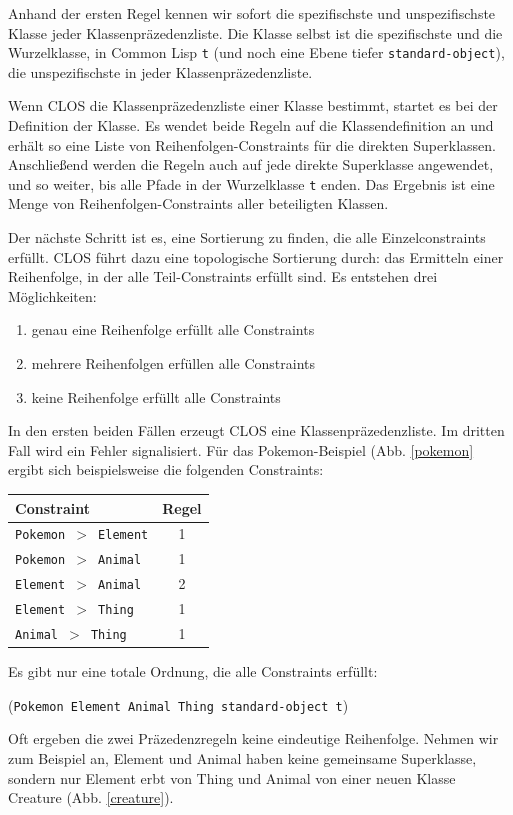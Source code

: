 Anhand der ersten Regel kennen wir sofort die spezifischste und unspezifischste Klasse jeder Klassenpräzedenzliste. Die Klasse selbst ist die spezifischste und die Wurzelklasse, in Common Lisp \texttt{t} (und noch eine Ebene tiefer \texttt{standard-object}), die unspezifischste in jeder Klassenpräzedenzliste.

Wenn CLOS die Klassenpräzedenzliste einer Klasse bestimmt, startet es bei der Definition der Klasse. Es wendet beide Regeln auf die Klassendefinition an und erhält so eine Liste von Reihenfolgen-Constraints für die direkten Superklassen. Anschließend werden die Regeln auch auf jede direkte Superklasse angewendet, und so weiter, bis alle Pfade in der Wurzelklasse \texttt{t} enden. Das Ergebnis ist eine Menge von Reihenfolgen-Constraints aller beteiligten Klassen.

Der nächste Schritt ist es, eine Sortierung zu finden, die alle Einzelconstraints erfüllt. CLOS führt dazu eine topologische Sortierung durch: das Ermitteln einer Reihenfolge, in der alle Teil-Constraints erfüllt sind. Es entstehen drei Möglichkeiten:
\begin{enumerate}
 \item genau eine Reihenfolge erfüllt alle Constraints
 \item mehrere Reihenfolgen erfüllen alle Constraints
 \item keine Reihenfolge erfüllt alle Constraints
\end{enumerate}

In den ersten beiden Fällen erzeugt CLOS eine Klassenpräzedenzliste. Im dritten Fall wird ein Fehler signalisiert. Für das Pokemon-Beispiel (Abb. \ref{pokemon} ergibt sich beispielsweise die folgenden Constraints:

\begin{tabular}{l|c}
 \textbf{Constraint} & \textbf{Regel}\\ \hline
 \texttt{Pokemon $>$ Element} & 1\\
 \texttt{Pokemon $>$ Animal}  & 1\\
 \texttt{Element $>$ Animal}  & 2\\
 \texttt{Element $>$ Thing}   & 1\\
 \texttt{Animal  $>$ Thing}   & 1
\end{tabular}

Es gibt nur eine totale Ordnung, die alle Constraints erfüllt:

(\texttt{Pokemon Element Animal Thing standard-object t})

Oft ergeben die zwei Präzedenzregeln keine eindeutige Reihenfolge. Nehmen wir zum Beispiel an, Element und Animal haben keine gemeinsame Superklasse, sondern nur Element erbt von Thing und Animal von einer neuen Klasse Creature (Abb. \ref{creature}). 

